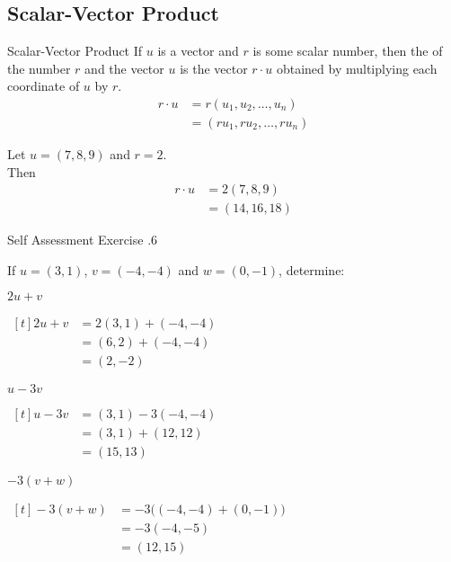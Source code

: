 \documentclass[\main/notes.tex]{subfiles}
\begin{document}
			\subsection{Scalar-Vector Product}
				\begin{definition}{Scalar-Vector Product}
					If $u$ is a vector and $r$ is some scalar number, then the  of the number $r$ and the vector $u$ is the vector $r \cdot u$ obtained by multiplying each coordinate of $u$ by $r$.
					\begin{align*}
						r\cdot u &= r(u_{1}, u_{2}, \ldots, u_{n})\\
						&= (ru_{1}, ru_{2}, \ldots, ru_{n})
					\end{align*}
				\end{definition}
				\begin{example}[width=0.5\textwidth]
					Let $u = (7, 8, 9)$ and $r = 2$.\\
					Then
					\begin{align*}
						r \cdot u &= 2(7, 8, 9)\\
						&= (14, 16, 18)
					\end{align*}
				\end{example}
				\begin{exercise}{Self Assessment Exercise \thechapter.6}
					\begin{questions}
						\item If $u = (3, 1)$, $v = (-4, -4)$ and $w = (0, -1)$, determine:
							\begin{questions}
								\item $2u + v$ \hfill
									\begin{answer}
										$ \begin{aligned}[t]
											2u + v &= 2(3, 1) + (-4, -4)\\
											&= (6, 2) + (-4, -4)\\
											&= (2, -2)
										\end{aligned} $ \hfill \phantom{}
									\end{answer}
								\item $u - 3v$ \hfill
									\begin{answer}
										$ \begin{aligned}[t]
											u - 3v &= (3, 1) - 3(-4, -4)\\
											&= (3, 1) + (12, 12)\\
											&= (15, 13)
										\end{aligned} $ \hfill \phantom{}
									\end{answer}
								\item $-3(v + w)$ \hfill
									\begin{answer}
										$ \begin{aligned}[t]
											-3(v + w) &= -3\bigl((-4, -4) + (0, -1)\bigr)\\
											&= -3(-4, -5)\\
											&= (12, 15)
										\end{aligned} $ \hfill \phantom{}
									\end{answer}
							\end{questions}
					\end{questions}
				\end{exercise}
			\pagebreak
\end{document}
